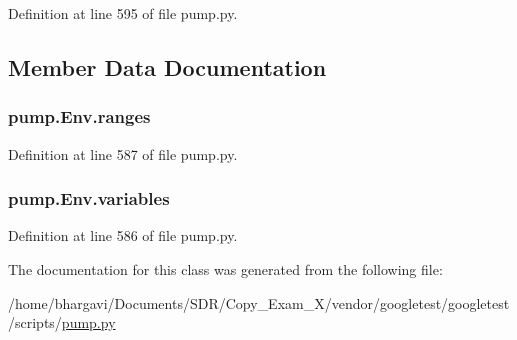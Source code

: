 Definition at line 595 of file pump.\+py.



\subsection{Member Data Documentation}
\subsubsection[{\texorpdfstring{ranges}{ranges}}]{\setlength{\rightskip}{0pt plus 5cm}pump.\+Env.\+ranges}\hypertarget{classpump_1_1_env_a8d5fec087c1a9108de9b105922b34309}{}\label{classpump_1_1_env_a8d5fec087c1a9108de9b105922b34309}


Definition at line 587 of file pump.\+py.

\subsubsection[{\texorpdfstring{variables}{variables}}]{\setlength{\rightskip}{0pt plus 5cm}pump.\+Env.\+variables}\hypertarget{classpump_1_1_env_aba6456f3d0d23ac92bc9508c1b966bcd}{}\label{classpump_1_1_env_aba6456f3d0d23ac92bc9508c1b966bcd}


Definition at line 586 of file pump.\+py.



The documentation for this class was generated from the following file\+:\begin{DoxyCompactItemize}
\item 
/home/bhargavi/\+Documents/\+S\+D\+R/\+Copy\+\_\+\+Exam\+\_\+X/vendor/googletest/googletest/scripts/\hyperlink{pump_8py}{pump.\+py}\end{DoxyCompactItemize}
